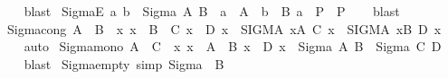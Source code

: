 \begin{isabellebody}
%
\isadelimproof
\ \ %
\endisadelimproof
%
\isatagproof
{}\isamarkupfalse%
\ blast%
\endisatagproof
{\isafoldproof}%
%
\isadelimproof
\isanewline
%
\endisadelimproof
\isanewline
{}\isamarkupfalse%
\ SigmaE{}{\isacharcolon}{\kern0pt}\ {\isachardoublequoteopen}{\isacharparenleft}{\kern0pt}a{\isacharcomma}{\kern0pt}\ b{\isacharparenright}{\kern0pt}\ {\isasymin}\ Sigma\ A\ B\ {\isasymLongrightarrow}\ {\isacharparenleft}{\kern0pt}a\ {\isasymin}\ A\ {\isasymLongrightarrow}\ b\ {\isasymin}\ B\ a\ {\isasymLongrightarrow}\ P{\isacharparenright}{\kern0pt}\ {\isasymLongrightarrow}\ P{\isachardoublequoteclose}\isanewline
%
\isadelimproof
\ \ %
\endisadelimproof
%
\isatagproof
{}\isamarkupfalse%
\ blast%
\endisatagproof
{\isafoldproof}%
%
\isadelimproof
\isanewline
%
\endisadelimproof
\isanewline
{}\isamarkupfalse%
\ Sigma{\isacharunderscore}{\kern0pt}cong{\isacharcolon}{\kern0pt}\ {\isachardoublequoteopen}A\ {\isacharequal}{\kern0pt}\ B\ {\isasymLongrightarrow}\ {\isacharparenleft}{\kern0pt}{\isasymAnd}x{\isachardot}{\kern0pt}\ x\ {\isasymin}\ B\ {\isasymLongrightarrow}\ C\ x\ {\isacharequal}{\kern0pt}\ D\ x{\isacharparenright}{\kern0pt}\ {\isasymLongrightarrow}\ {\isacharparenleft}{\kern0pt}SIGMA\ x{\isacharcolon}{\kern0pt}A{\isachardot}{\kern0pt}\ C\ x{\isacharparenright}{\kern0pt}\ {\isacharequal}{\kern0pt}\ {\isacharparenleft}{\kern0pt}SIGMA\ x{\isacharcolon}{\kern0pt}B{\isachardot}{\kern0pt}\ D\ x{\isacharparenright}{\kern0pt}{\isachardoublequoteclose}\isanewline
%
\isadelimproof
\ \ %
\endisadelimproof
%
\isatagproof
{}\isamarkupfalse%
\ auto%
\endisatagproof
{\isafoldproof}%
%
\isadelimproof
\isanewline
%
\endisadelimproof
\isanewline
{}\isamarkupfalse%
\ Sigma{\isacharunderscore}{\kern0pt}mono{\isacharcolon}{\kern0pt}\ {\isachardoublequoteopen}A\ {\isasymsubseteq}\ C\ {\isasymLongrightarrow}\ {\isacharparenleft}{\kern0pt}{\isasymAnd}x{\isachardot}{\kern0pt}\ x\ {\isasymin}\ A\ {\isasymLongrightarrow}\ B\ x\ {\isasymsubseteq}\ D\ x{\isacharparenright}{\kern0pt}\ {\isasymLongrightarrow}\ Sigma\ A\ B\ {\isasymsubseteq}\ Sigma\ C\ D{\isachardoublequoteclose}\isanewline
%
\isadelimproof
\ \ %
\endisadelimproof
%
\isatagproof
{}\isamarkupfalse%
\ blast%
\endisatagproof
{\isafoldproof}%
%
\isadelimproof
\isanewline
%
\endisadelimproof
\isanewline
{}\isamarkupfalse%
\ Sigma{\isacharunderscore}{\kern0pt}empty{}\ {\isacharbrackleft}{\kern0pt}simp{\isacharbrackright}{\kern0pt}{\isacharcolon}{\kern0pt}\ {\isachardoublequoteopen}Sigma\ {\isacharbraceleft}{\kern0pt}{\isacharbraceright}{\kern0pt}\ B\ {\isacharequal}{\kern0pt}\ {\isacharbraceleft}{\kern0pt}{\isacharbraceright}{\kern0pt}{\isachardoublequoteclose}\isanewline

\end{isabellebody}
